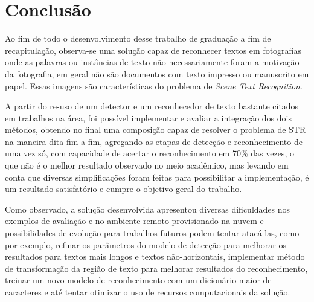 \chapter{Conclusão}

Ao fim de todo o desenvolvimento desse trabalho de graduação a fim de recapitulação, observa-se uma solução capaz de reconhecer textos em fotografias onde as palavras ou instâncias de texto não necessariamente foram a motivação da fotografia, em geral não são documentos com texto impresso ou manuscrito em papel. Essas imagens são características do problema de \textit{Scene Text Recognition}.

A partir do re-uso de um detector e um reconhecedor de texto bastante citados em trabalhos na área, foi possível implementar e avaliar a integração dos dois métodos, obtendo no final uma composição capaz de resolver o problema de STR na maneira dita fim-a-fim, agregando as etapas de detecção e reconhecimento de uma vez só, com capacidade de acertar o reconhecimento em 70\% das vezes, o que não é o melhor resultado observado no meio acadêmico, mas levando em conta que diversas simplificações foram feitas para possibilitar a implementação, é um resultado satisfatório e cumpre o objetivo geral do trabalho.

Como observado, a solução desenvolvida apresentou diversas dificuldades nos exemplos de avaliação e no ambiente remoto provisionado na nuvem e possibilidades de evolução para trabalhos futuros podem tentar atacá-las, como por exemplo, refinar os parâmetros do modelo de detecção para melhorar os resultados para textos mais longos e textos não-horizontais, implementar método de transformação da região de texto para melhorar resultados do reconhecimento, treinar um novo modelo de reconhecimento com um dicionário maior de caracteres e até tentar otimizar o uso de recursos computacionais da solução.
